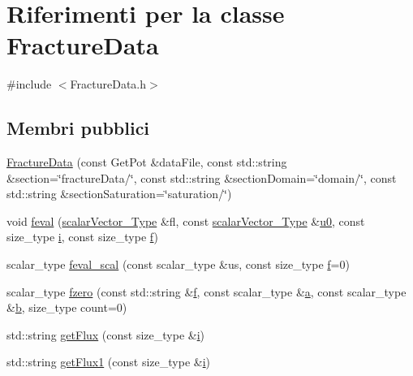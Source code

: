 \hypertarget{classFractureData}{\section{Riferimenti per la classe Fracture\-Data}
\label{classFractureData}
}


{\ttfamily \#include $<$Fracture\-Data.\-h$>$}

\subsection*{Membri pubblici}
\begin{DoxyCompactItemize}
\item 
\hyperlink{classFractureData_a321da1e480bfd583c6a2c561ba1e0cf8}{Fracture\-Data} (const Get\-Pot \&data\-File, const std\-::string \&section=\char`\"{}fracture\-Data/\char`\"{}, const std\-::string \&section\-Domain=\char`\"{}domain/\char`\"{}, const std\-::string \&section\-Saturation=\char`\"{}saturation/\char`\"{})
\item 
void \hyperlink{classFractureData_a49671c83ba3f6501803913c224177a72}{feval} (\hyperlink{Core_8h_a4e75b5863535ba1dd79942de2846eff0}{scalar\-Vector\-\_\-\-Type} \&fl, const \hyperlink{Core_8h_a4e75b5863535ba1dd79942de2846eff0}{scalar\-Vector\-\_\-\-Type} \&\hyperlink{init_8m_aada26031cbb47e8d74da9873f5c1e3e1}{u0}, const size\-\_\-type \hyperlink{god__e_8m_a8604be5925f4266ab5ccc69675329c80}{i}, const size\-\_\-type \hyperlink{god__e_8m_a8ea372f7ee3c01d11fc4b4d13b8e6a75}{f})
\item 
scalar\-\_\-type \hyperlink{classFractureData_a8f6e19cc2575dd30498eb144d1d17554}{feval\-\_\-scal} (const scalar\-\_\-type \&us, const size\-\_\-type \hyperlink{god__e_8m_a8ea372f7ee3c01d11fc4b4d13b8e6a75}{f}=0)
\item 
scalar\-\_\-type \hyperlink{classFractureData_ae9fcfaedfb880fe7ef5bfe9eaffe0e50}{fzero} (const std\-::string \&\hyperlink{god__e_8m_a8ea372f7ee3c01d11fc4b4d13b8e6a75}{f}, const scalar\-\_\-type \&\hyperlink{init_8m_ab6991d210d93a78cdbdf6de1889c1259}{a}, const scalar\-\_\-type \&\hyperlink{rieman_8m_a21ad0bd836b90d08f4cf640b4c298e7c}{b}, size\-\_\-type count=0)
\item 
std\-::string \hyperlink{classFractureData_abc0da4d74175c7530375ad9368efb5f1}{get\-Flux} (const size\-\_\-type \&\hyperlink{god__e_8m_a8604be5925f4266ab5ccc69675329c80}{i})
\item 
std\-::string \hyperlink{classFractureData_aa30d8efee63dc3173cdd9864c9549ccf}{get\-Flux1} (const size\-\_\-type \&\hyperlink{god__e_8m_a8604be5925f4266ab5ccc69675329c80}{i})

\end{DoxyCompactItemize}
